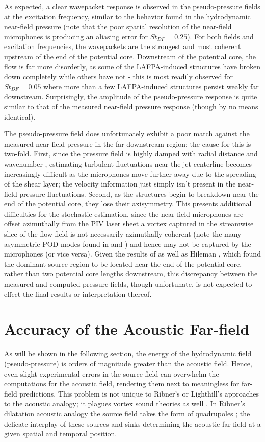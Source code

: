 As expected, a clear wavepacket response is observed in the pseudo-pressure fields at the excitation frequency, similar to the behavior found in the hydrodynamic near-field pressure (note that the poor spatial resolution of the near-field microphones is producing an aliasing error for $St_{DF}=0.25$).
For both fields and excitation frequencies, the wavepackets are the strongest and most coherent upstream of the end of the potential core.
Downstream of the potential core, the flow is far more disorderly, as some of the LAFPA-induced structures have broken down completely while others have not - this is most readily observed for $St_{DF}=0.05$ where more than a few LAFPA-induced structures persist weakly far downstream.
Surprisingly, the amplitude of the pseudo-pressure response is quite similar to that of the measured near-field pressure response (though by no means identical).

The pseudo-pressure field does unfortunately exhibit a poor match against the measured near-field pressure in the far-downstream region; the cause for this is two-fold.
First, since the pressure field is highly damped with radial distance and wavenumber \citep{Arndt1997}, estimating turbulent fluctuations near the jet centerline becomes increasingly difficult as the microphones move further away due to the spreading of the shear layer; the velocity information just simply isn't present in the near-field pressure fluctuations.
Second, as the structures begin to breakdown near the end of the potential core, they lose their axisymmetry.
This presents additional difficulties for the stochastic estimation, since the near-field microphones are offset azimuthally from the PIV laser sheet a vortex captured in the streamwise slice of the flow-field is not
necessarily azimuthally-coherent (note the many asymmetric POD modes found in  and ) and hence may not be captured by the microphones (or vice versa).
Given the results of  as well as Hileman \etal \citep{Hileman2005}, which found the dominant source region to be located near the end of the potential core, rather than two potential core lengths downstream, this discrepancy between the measured and computed pressure fields, though unfortunate, is not expected to effect the final results or interpretation thereof.  

\section{Accuracy of the Acoustic Far-field}
As will be shown in the following section, the energy of the hydrodynamic field (pseudo-pressure) is orders of magnitude greater than the acoustic field.
Hence, even slight experimental errors in the source field can overwhelm the computations for the acoustic field, rendering them next to meaningless for far-field predictions.
This problem is not unique to Ribner's or Lighthill's approaches to the acoustic analogy; it plagues vortex sound theories as well \citep{Bridges1992}.
In Ribner's dilatation acoustic analogy the source field takes the form of quadrupoles \citep{Ristorcelli1997}; the delicate interplay of these sources and sinks determining the acoustic far-field at a given spatial and temporal position.

